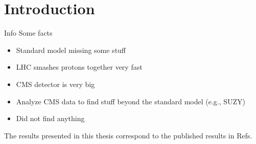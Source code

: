 \chapter{Introduction}

\begin{section}{Info}
Some facts

\begin{itemize}

\item Standard model missing some stuff
\item LHC smashes protons together very fast
\item CMS detector is very big
\item Analyze CMS data to find stuff beyond the standard model (e.g., SUZY)
\item Did not find anything

\end{itemize}

The results presented in this thesis correspond to the published results in Refs.~\cite{CMS:myTOPRun2PAS,CMS:mySUSRun2PAS,CMS:myTOP2016,CMS:mySUS2016}

\end{section}
